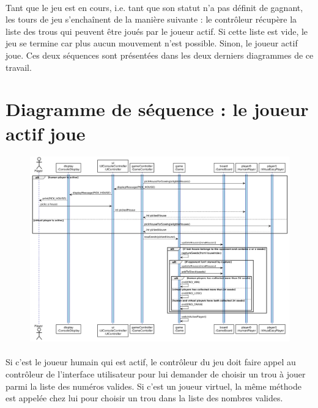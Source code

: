 \documentclass{article}
\begin{document}
    \paragraph{}
    Tant que le jeu est en cours, i.e. tant que son statut n'a pas définit de gagnant, les tours de jeu s'enchaînent de la manière suivante : le contrôleur récupère la liste des trous qui peuvent être joués par le joueur actif. Si cette liste est vide, le jeu se termine car plus aucun mouvement n'est possible. Sinon, le joueur actif joue. Ces deux séquences sont présentées dans les deux derniers diagrammes de ce travail.

    \newpage
    \section{Diagramme de séquence : le joueur actif joue}

    \begin{figure}[H]
        \centering
        \includegraphics[width=\linewidth]{./schemas/sequence4-active-player-plays.png}
    \end{figure}

    \paragraph{}
    Si c'est le joueur humain qui est actif, le contrôleur du jeu doit faire appel au contrôleur de l'interface utilisateur pour lui demander de choisir un trou à jouer parmi la liste des numéros valides. Si c'est un joueur virtuel, la même méthode est appelée chez lui pour choisir un trou dans la liste des nombres valides.
\end{document}
